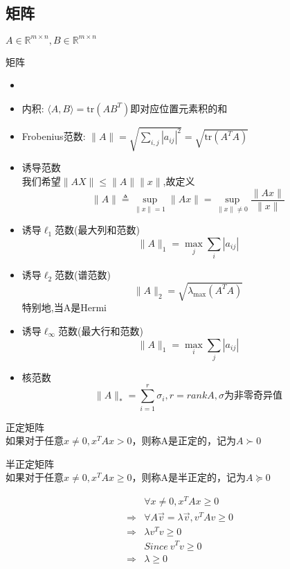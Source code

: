 \documentclass{mytemplate}
\begin{document}
\subsection{矩阵}
$A\in \mathbb{R}^{m \times n}, B \in \mathbb{R}^{m \times n}$
\begin{definition}{矩阵}
    \begin{itemize}
        \item
        \item 内积: $\langle A, B \rangle = \text{tr} (AB^T) \text{即对应位置元素积的和}$
        \item  Frobenius范数: $\|A\| = \sqrt{\sum_{i,j}|a_{ij}|^2} = \sqrt{\text{tr}(A^T A)}$
        \item 诱导范数\\
              我们希望$\|AX\| \leq \|A\| \|x\|$,故定义
              \[
                  \|A\| \triangleq \sup_{\|x\|=1} \|Ax\| = \sup_{\|x\|\neq0} \frac{\|Ax\|}{\|x\|}
              \]
        \item 诱导$\ell_1$范数(最大列和范数)
              \[
                  \|A\|_1 = \max_j \sum_{i}|a_{ij}|
              \]
        \item 诱导$\ell_2$范数(谱范数)
              \[
                  \|A\|_2 = \sqrt{\lambda_{\max}(A^T A)}
              \]
              特别地,当A是Hermi
        \item 诱导$\ell_{\infty}$范数(最大行和范数)
              \[
                  \|A\|_1 = \max_i \sum_{j}|a_{ij}|
              \]
        \item 核范数
              \[
                  \|A\|_* = \sum_{i=1}^{r} \sigma_i, r=rank{A},\sigma\text{为非零奇异值}
              \]
    \end{itemize}
\end{definition}

\begin{definition}
    正定矩阵\\
    如果对于任意$x \neq 0, x^T Ax >0$，则称A是正定的，记为$A \succ 0$
\end{definition}
\begin{definition}
    半正定矩阵\\
    如果对于任意$x \neq 0, x^T Ax \geq 0$，则称A是半正定的，记为$A \succeq  0$
\end{definition}
\begin{align}
                & \forall x \neq 0, x^T Ax\geq 0                   \\
    \Rightarrow & \forall A\vec{v} =\lambda \vec{v}, v^T A v\geq 0 \\
    \Rightarrow & \lambda v^T v \geq 0                             \\
                & Since\ v^T v \geq 0                              \\
    \Rightarrow & \lambda \geq 0
\end{align}
\end{document}
